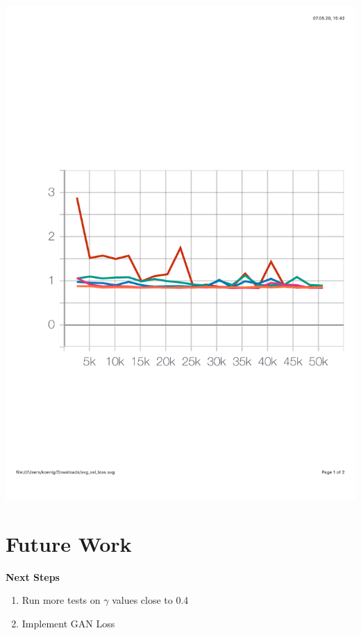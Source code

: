 \documentclass{article}
\newenvironment{Figure}
  {\par\medskip\noindent\minipage{\linewidth}}
  {\endminipage\par\medskip}
\begin{document}
\begin{multicols}{2}
\begin{Figure}
	\centering 
	\includegraphics[width=\linewidth]{figures/val_loss}
	\label{fig:val}
\end{Figure}

\section{Future Work}
\textbf{Next Steps}
\begin{enumerate}
	\item Run more tests on $\gamma$ values close to 0.4
	\item Implement GAN Loss
\end{enumerate}


\end{multicols}
\end{document}

